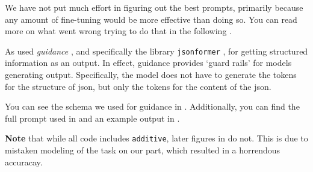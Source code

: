 We have not put much effort in figuring out the best prompts, primarily because any amount of fine-tuning would be more effective than doing so. You can read more on what went wrong trying to do that in the following .

As used \textit{guidance} \cite{guidance_2023}, and specifically the library \texttt{jsonformer} \cite{1rgs_2023}, for getting structured information as an output.
In effect, guidance provides `guard rails' for models generating output.
Specifically, the model does not have to generate the tokens for the structure of json, but only the tokens for the content of the json.


You can see the schema we used for guidance in . Additionally, you can find the full prompt used in  and an example output in .



\textbf{Note} that while all code includes \texttt{additive}, later figures in  do not.
This is due to mistaken modeling of the task on our part, which resulted in a horrendous accuracay. 


